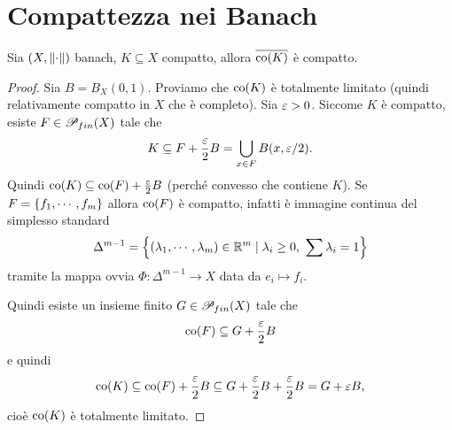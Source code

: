 \section{Compattezza nei Banach}
\begin{theorem}[Mazur]\label{ThMazur}
Sia $(X,{\left\Vert{\cdot}\right\Vert})$ banach, $K\subseteq X$ compatto, allora $\overline{\operatorname{co}(K)}$ \`e compatto.
\end{theorem}
\begin{proof}
Sia $B=B_X(0,1)$. Proviamo che $\operatorname{co}(K)$ \`e totalmente limitato (quindi relativamente compatto in $X$ che \`e completo). Sia $\varepsilon>0$. Siccome $K$ \`e compatto, esiste $F\in \mathscr{P}_{fin}(X)$ tale che 
\[K\subseteq F+\frac{\varepsilon}2B=\bigcup_{x\in F}B(x,\varepsilon/2).\]
Quindi $\operatorname{co}(K)\subseteq \operatorname{co}(F)+\frac{\varepsilon}2 B$ (perch\'e convesso che contiene $K$). Se $F=\left\{{f_1,\cdots, f_m}\right\}$ allora $\operatorname{co}(F)$ \`e compatto, infatti \`e immagine continua del simplesso standard 
\[\Delta^{m-1}=\left\{{(\lambda_1,\cdots, \lambda_m)\in\mathbb{R}^m\mid \lambda_i\geq 0,\ \sum\lambda_i=1}\right\}\]
tramite la mappa ovvia $\Phi:\Delta^{m-1}\to X$ data da $e_i\mapsto f_i$.

Quindi esiste un insieme finito $G\in\mathscr{P}_{fin}(X)$ tale che
\[\operatorname{co}(F)\subseteq G+\frac{\varepsilon}2B\]
e quindi 
\[\operatorname{co}(K)\subseteq \operatorname{co}(F)+\frac{\varepsilon}2B\subseteq G+\frac{\varepsilon}2B+\frac{\varepsilon}2 B=G+\varepsilon B,\]
cio\`e $\operatorname{co}(K)$ \`e totalmente limitato.
\end{proof}

